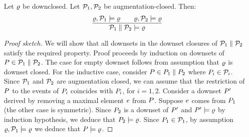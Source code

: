 \begin{proposition}%
  Let $\varrho$ be downclosed.  Let $\mathcal{P}_1, \mathcal{P}_2$ be
  augmentation\hyp{}closed. %
  Then:
  \begin{displaymath}
    \frac{
      \varrho, \mathcal{P}_1 \models\varrho
      \qquad
      \varrho, \mathcal{P}_2 \models\varrho
    }{\mathcal{P}_1 \parallel \mathcal{P}_2 \models \varrho}
  \end{displaymath}
\end{proposition}
\begin{proof}[Proof sketch]
  We will show that all downsets in the downset closures of
  $\mathcal{P}_1 \parallel \mathcal{P}_2$ satisfy the required property.  Proof proceeds
  by induction on downsets of $P \in \mathcal{P}_1 \parallel \mathcal{P}_2$.
  The case for empty downset  follows from assumption that  $\varrho$ is downset closed.  
  For the inductive case, consider %
  $P \in P_1 \parallel P_2$ where
  $P_i \in \mathcal{P}_i$.  Since $\mathcal{P}_1$ and $\mathcal{P}_2$ are augmentation
  closed, we can assume that the restriction of $P$ to the events of
  $P_i$ coincides with $P_i$, for $i=1,2$.
  Consider a downset $P'$ derived by removing a maximal element $e$ from
  $P$.  Suppose $e$ comes from $P_1$ (the other case is
  symmetric). Since $P_2$ is a downset of $P'$ and $P' \models \varrho$
  by induction hypothesis, we deduce that $P_2 \models \varrho$.
  Since $P_1 \in \mathcal{P}_1$, by assumption $\varrho, \mathcal{P}_1 \models\varrho$ we
  deduce that $P \models \varrho$.
\end{proof}


